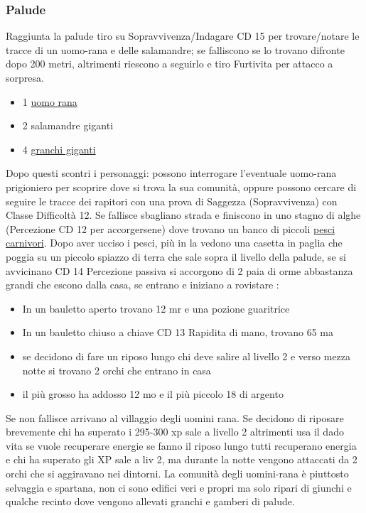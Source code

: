 \documentclass{article}
\begin{document}
\subsubsection{Palude} Raggiunta la palude tiro su Sopravvivenza/Indagare CD 15 per trovare/notare le tracce di un uomo-rana e delle salamandre; se falliscono se lo trovano difronte dopo 200 metri, altrimenti riescono a seguirlo e tiro Furtivita per attacco a sorpresa. 
\begin{itemize}
    \item 1 \hyperlink{uomorana}{uomo rana}
    \item 2 salamandre giganti
    \item 4 \hyperlink{granchio}{granchi giganti}
\end{itemize}




Dopo questi scontri i personaggi: possono interrogare l’eventuale uomo-rana prigioniero per scoprire dove si trova la sua comunità, oppure possono cercare di seguire le tracce dei rapitori con una prova di Saggezza (Sopravvivenza) con Classe Difficoltà 12.
Se fallisce sbagliano strada e finiscono in uno stagno di alghe (Percezione CD 12 per accorgersene) dove trovano un banco di piccoli \hyperlink{sciame}{pesci carnivori}. Dopo aver ucciso i pesci, più in la vedono una casetta in paglia che poggia su un piccolo spiazzo di terra che sale sopra il livello della palude, se si avvicinano CD 14 Percezione passiva si accorgono di 2 paia di orme abbastanza grandi che escono dalla casa, se entrano e iniziano a rovistare :
\begin{itemize}
    \item In un bauletto aperto trovano 12 mr e una pozione guaritrice
    \item In un bauletto chiuso a chiave CD 13 Rapidita di mano, trovano 65 ma
\end{itemize}
\begin{itemize}
    \item se decidono di fare un riposo lungo chi deve salire al livello 2 e verso mezza notte si trovano 2 orchi che entrano in casa
    \item il più grosso ha addosso 12 mo e il più piccolo 18 di argento
\end{itemize}
Se non fallisce arrivano al villaggio degli uomini rana. Se decidono di riposare brevemente chi ha superato i 295-300 xp sale a livello 2 altrimenti usa il dado vita se vuole recuperare energie se fanno il riposo lungo tutti recuperano energia e chi ha superato gli XP sale a liv 2, ma durante la notte vengono attaccati da 2 orchi che si aggiravano nei dintorni.
La comunità degli uomini-rana è piuttosto selvaggia e spartana, non ci sono edifici veri e propri ma solo ripari di giunchi e qualche recinto dove vengono allevati granchi e gamberi di palude.
\end{document}
